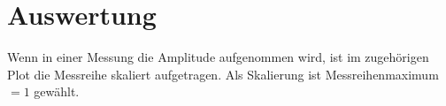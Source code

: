 \section{Auswertung}
\label{sec:Auswertung}
Wenn in einer Messung die Amplitude aufgenommen wird,
ist im zugehörigen Plot die Messreihe skaliert aufgetragen.
Als Skalierung ist Messreihenmaximum $=1$ gewählt.




